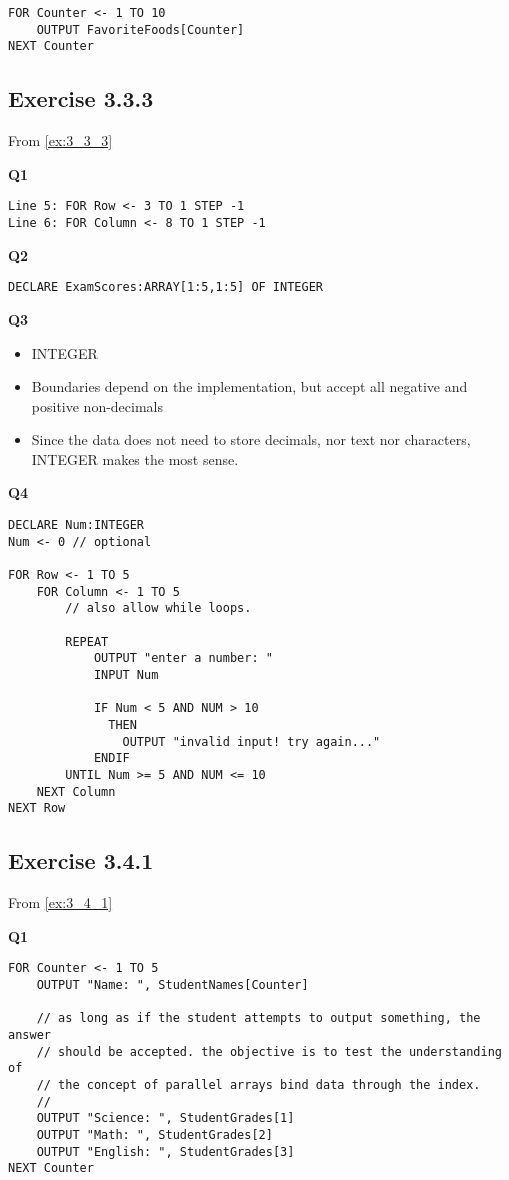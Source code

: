 \documentclass[./main.tex]{subfiles}
\begin{document}
\begin{verbatim}
FOR Counter <- 1 TO 10
    OUTPUT FavoriteFoods[Counter]
NEXT Counter
\end{verbatim}

\newpage
\subsection*{Exercise 3.3.3}
From \ref{ex:3_3_3}

\textbf{Q1}
\begin{verbatim}
Line 5: FOR Row <- 3 TO 1 STEP -1
Line 6: FOR Column <- 8 TO 1 STEP -1
\end{verbatim}

\textbf{Q2}
\begin{verbatim}
DECLARE ExamScores:ARRAY[1:5,1:5] OF INTEGER 
\end{verbatim}

\textbf{Q3}
\begin{itemize}
    \item INTEGER
    \item Boundaries depend on the implementation, but accept all negative and positive non-decimals
    \item Since the data does not need to store decimals, nor text nor characters, INTEGER makes the most sense.
\end{itemize}

\textbf{Q4}
\begin{verbatim}
DECLARE Num:INTEGER
Num <- 0 // optional

FOR Row <- 1 TO 5
    FOR Column <- 1 TO 5
        // also allow while loops.

        REPEAT
            OUTPUT "enter a number: "
            INPUT Num
            
            IF Num < 5 AND NUM > 10
              THEN
                OUTPUT "invalid input! try again..."
            ENDIF
        UNTIL Num >= 5 AND NUM <= 10
    NEXT Column
NEXT Row
\end{verbatim}

\newpage
\subsection*{Exercise 3.4.1}
From \ref{ex:3_4_1}

\textbf{Q1}
\begin{verbatim}
FOR Counter <- 1 TO 5
    OUTPUT "Name: ", StudentNames[Counter]
    
    // as long as if the student attempts to output something, the answer
    // should be accepted. the objective is to test the understanding of
    // the concept of parallel arrays bind data through the index.
    //
    OUTPUT "Science: ", StudentGrades[1]
    OUTPUT "Math: ", StudentGrades[2]
    OUTPUT "English: ", StudentGrades[3]
NEXT Counter
\end{verbatim}   
\end{document}
